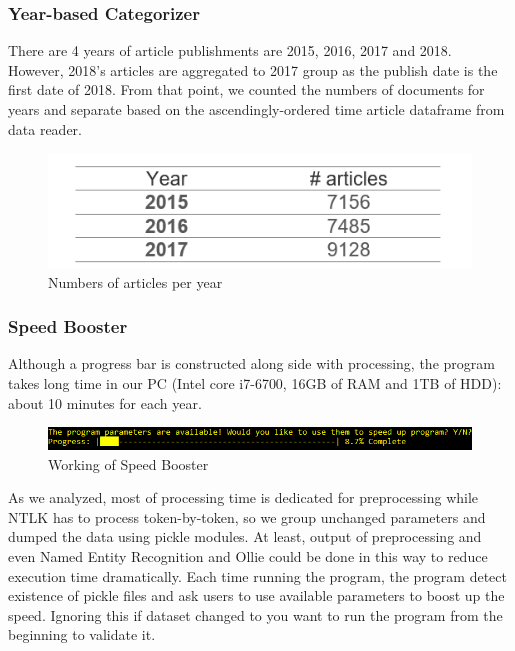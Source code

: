 \subsubsection{Year-based Categorizer}
There are 4 years of article publishments are 2015, 2016, 2017 and 2018. However, 2018’s articles are aggregated to 2017 group as the publish date is the first date of 2018. From that point, we counted the numbers of documents 
for years and separate based on the ascendingly-ordered time article dataframe from data reader. 
\begin{figure}[h]
\centering
\includegraphics[scale= 0.6]{table_1.png}
\caption{Numbers of articles per year}
\end{figure}
\subsubsection{Speed Booster}
Although a progress bar is constructed along side with processing, the program takes long time in our PC (Intel core i7-6700, 16GB of RAM and 1TB of HDD): about 10 minutes for each year.

\begin{figure}[h]
\centering
\includegraphics[scale= 0.4]{fig1.png}
\caption{Working of Speed Booster}
\end{figure}

As we analyzed, most of processing time is dedicated for preprocessing while NTLK has to process token-by-token, so we group unchanged parameters and dumped the data using pickle modules. At least, output of preprocessing and even Named Entity Recognition and Ollie could be done in this way to reduce execution time dramatically. Each time running the program, the program detect existence of pickle files and ask users to use available parameters to boost up the speed. Ignoring this if dataset changed to you want to run the program from the beginning to validate it.
